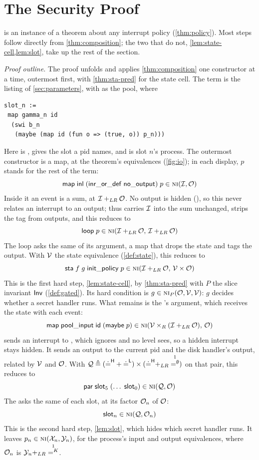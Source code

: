 \section{The Security Proof}\label{sec:proof}
 is an instance of a theorem about any interrupt policy
(\cref{thm:policy}). Most steps follow directly from \cref{thm:composition}; the two
that do not, \cref{lem:state-cell,lem:slot}, take up the rest of the section.

\emph{Proof outline.} The proof unfolds  and
applies \cref{thm:composition} one constructor at a time, outermost first,
with \cref{thm:sta-pred} for the state cell. The term is the listing of
\cref{sec:parameters}, with  as the pool, where
\begin{lstlisting}
slot_n :=
 map gamma_n id
  (swi b_n
   (maybe (map id (fun o => (true, o)) p_n)))
\end{lstlisting}
Here  is ,  gives
the slot a pid names, and  is slot $n$'s process. The outermost constructor
is a map, at the theorem's equivalences (\cref{fig:io}); in each display, $p$ stands
for the rest of the term:
\[
\mathsf{map}\;\mathsf{inl}\;(\mathsf{inr\_or\_def}\;\mathsf{no\_output})\;p
  \in \text{\normalfont\scshape ni}(\mathcal{I},\mathcal{O})
\]
Inside it an event is a sum, at $\mathcal{I} +_{LR} \mathcal{O}$. No output is hidden
(), so this never
relates an interrupt to an output;  thus carries $\mathcal{I}$ into the sum unchanged,  strips the tag from outputs, and this
reduces to
\[
\mathsf{loop}\;p \in \text{\normalfont\scshape ni}(\mathcal{I} +_{LR} \mathcal{O},\, \mathcal{I} +_{LR} \mathcal{O})
\]
The loop asks the same of its argument, a map that drops the state and tags the output.
With $\mathcal{V}$ the state equivalence (\cref{def:state}), this reduces to
\[
\mathsf{sta}\;f\;g\;\mathsf{init\_policy}\;p
  \in \text{\normalfont\scshape ni}(\mathcal{I} +_{LR} \mathcal{O},\, \mathcal{V} \times \mathcal{O})
\]
This is the first hard step, \cref{lem:state-cell}, by \cref{thm:sta-pred} with $P$
the slice invariant $\mathsf{Inv}$ (\cref{def:gated}). Its hard condition is
$g \in \text{\normalfont\scshape ni}_P(\mathcal{O},\mathcal{V},\mathcal{V})$: $g$ decides whether a secret handler runs.
What remains is the 's
argument, which receives the state with each event:
\[
\mathsf{map}\;\mathsf{pool\_input}\;\mathsf{id}\;(\mathsf{maybe}\;p)
  \in \text{\normalfont\scshape ni}(\mathcal{V} \times_R (\mathcal{I} +_{LR} \mathcal{O}),\, \mathcal{O})
\]
 sends an interrupt to , which  ignores and no level
sees, so a hidden interrupt stays hidden. It sends an output to the current pid and the
disk handler's output, related by $\mathcal{V}$ and $\mathcal{O}$. With
$\Eq \triangleq (\priveq + \pubeq) \times (\priveq +_{LR} \one^\emptyset)$ on that pair, this
reduces to
\[
\mathsf{par}\;\mathsf{slot}_5\;(\dots\;\mathsf{slot}_0) \in \text{\normalfont\scshape ni}(\mathcal{Q},\mathcal{O})
\]
The  asks the same of each slot, at its factor $\mathcal{O}_n$ of $\mathcal{O}$:
\[
\mathsf{slot}_n \in \text{\normalfont\scshape ni}(\mathcal{Q},\mathcal{O}_n)
\]
This is the second hard step, \cref{lem:slot}, which hides which secret handler runs. It
leaves $p_n \in \text{\normalfont\scshape ni}(\mathcal{X}_n,\mathcal{Y}_n)$, for the process's input and output equivalences,
where $\mathcal{O}_n$ is $\Ey_n +_{LR} \one^K$.

